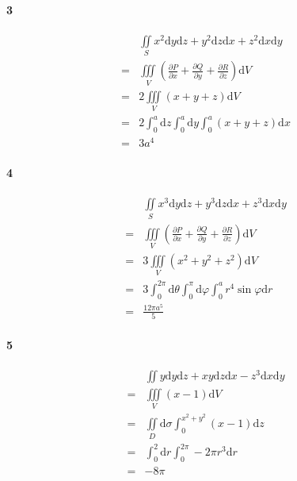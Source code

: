 \documentclass[UTF8]{ctexart}
\begin{document}
    \paragraph*{3}
    \begin{align*}
        &\iint \limits_S x^2 \mathrm{d}y \mathrm{d}z + y^2 \mathrm{d}z \mathrm{d}x + z^2 \mathrm{d}x \mathrm{d}y \\
            =& \iiint \limits_{V} \left(\frac{\partial P}{\partial x} +
            \frac{\partial Q}{\partial y} +
            \frac{\partial R}{\partial z} \right) \mathrm{d}V \\
            =& 2 \iiint \limits_{V} (x+y+z) \mathrm{d}V\\
            =&2 \int_{0}^{a} \mathrm{d}z \int_{0}^{a} \mathrm{d}y \int_{0}^{a} (x+y+z)\mathrm{d}x \\
            =&3a^4
    \end{align*}
    \paragraph*{4}
    \begin{align*}
        &\iint \limits_S x^3 \mathrm{d}y \mathrm{d}z + y^3 \mathrm{d}z \mathrm{d}x + z^3 \mathrm{d}x \mathrm{d}y \\
        =& \iiint \limits_{V} \left(\frac{\partial P}{\partial x} +
            \frac{\partial Q}{\partial y} +
            \frac{\partial R}{\partial z} \right) \mathrm{d}V \\
        =& 3\iiint \limits_{V} (x^2+y^2+z^2)\mathrm{d}V \\
        =& 3 \int_{0}^{2\pi} \mathrm{d}\theta \int_{0}^{\pi} \mathrm{d}\varphi \int_{0}^{a} r^4 \sin \varphi \mathrm{d}r \\
        =& \frac{12\pi a^5}{5} 
    \end{align*}
    \paragraph*{5}
    \begin{align*}
        &\iint y \mathrm{d}y \mathrm{d}z + xy \mathrm{d}z \mathrm{d}x - z^3 \mathrm{d}x \mathrm{d}y \\
        =& \iiint \limits_{V} (x-1)\mathrm{d}V \\
        =& \iint \limits_D  \mathrm{d}\sigma \int_{0}^{x^2+y^2} (x-1) \mathrm{d}z \\
        =& \int_{0}^{2} \mathrm{d}r \int_{0}^{2\pi} -2\pi r^3 \mathrm{d}r \\
        =& -8\pi
    \end{align*}
\end{document}
